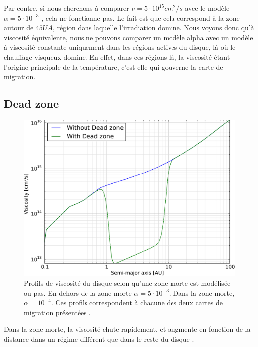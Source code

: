 Par contre, si nous cherchons à comparer $\nu=5\cdot 10^{15}\unit{cm^2/s}$  avec le modèle $\alpha=5\cdot 10^{-3}$ , cela ne fonctionne pas. Le fait est que cela correspond à la zone autour de $45\unit{UA}$, région dans laquelle l'irradiation domine. Nous voyons donc qu'à viscosité équivalente, nous ne pouvons comparer un modèle alpha avec un modèle à viscosité constante uniquement dans les régions actives du disque, là où le chauffage visqueux domine. En effet, dans ces régions là, la viscosité étant l'origine principale de la température, c'est elle qui gouverne la carte de migration. 

\subsection{Dead zone}
\begin{figure}[htb]
\centering
\includegraphics[width=0.6\linewidth]{figure/migration_map/viscosity/dead_zone_profile.pdf}
\caption{Profils de viscosité du disque selon qu'une zone morte est modélisée ou pas. En dehors de la zone morte $\alpha=5\cdot 10^{-3}$. Dans la zone morte, $\alpha=10^{-4}$. Ces profils correspondent à chacune des deux cartes de migration
présentées \protect{}. }\label{fig:dead_zone_profile}
\end{figure}

Dans la zone morte, la viscosité chute rapidement, et augmente en fonction de la distance dans un régime différent que dans le reste du disque . 

